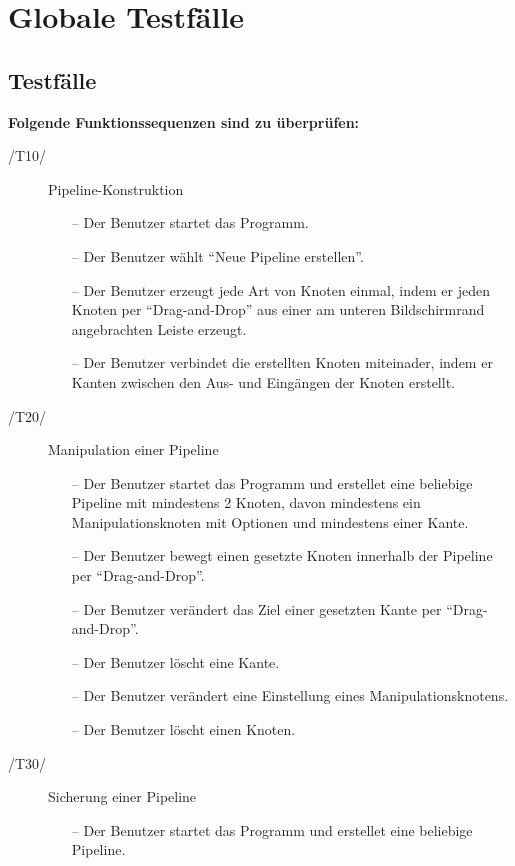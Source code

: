 \section{Globale Testfälle}

\subsection{Testfälle}

\textbf{Folgende Funktionssequenzen sind zu überprüfen:}

\begin{description}
	\item[/T10/] Pipeline-Konstruktion
		\begin{itemize}
			\item[--] Der Benutzer startet das Programm.
			\item[--] Der Benutzer wählt ``Neue Pipeline erstellen''.
			\item[--] Der Benutzer erzeugt jede Art von Knoten einmal, indem er jeden Knoten per ``Drag-and-Drop'' aus einer am unteren Bildschirmrand
				angebrachten Leiste erzeugt.
			\item[--] Der Benutzer verbindet die erstellten Knoten miteinader, indem er Kanten zwischen den Aus- und Eingängen der Knoten erstellt.
		\end{itemize}
	\item[/T20/] Manipulation einer Pipeline
		\begin{itemize}
			\item[--] Der Benutzer startet das Programm und erstellet eine beliebige Pipeline mit mindestens 2 Knoten, davon mindestens ein Manipulationsknoten mit Optionen 
				und mindestens einer Kante.
			\item[--] Der Benutzer bewegt einen gesetzte Knoten innerhalb der Pipeline per ``Drag-and-Drop''.
			\item[--] Der Benutzer verändert das Ziel einer gesetzten Kante per ``Drag-and-Drop''.
			\item[--] Der Benutzer löscht eine Kante.
			\item[--] Der Benutzer verändert eine Einstellung eines Manipulationsknotens.
			\item[--] Der Benutzer löscht einen Knoten.
		\end{itemize}
	\item[/T30/] Sicherung einer Pipeline
		\begin{itemize}
			\item[--] Der Benutzer startet das Programm und erstellet eine beliebige Pipeline.

\end{itemize}
\end{description}
